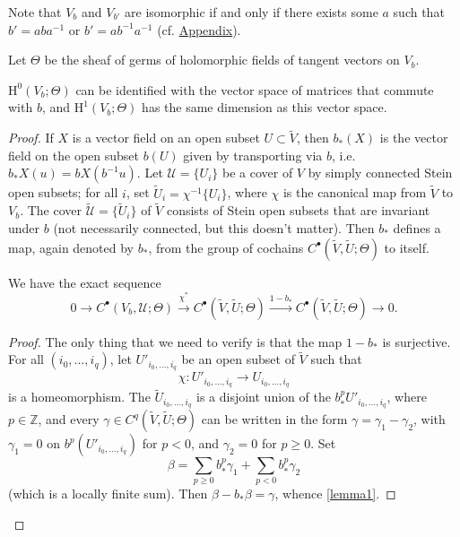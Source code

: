 \documentclass{article}
\theoremstyle{plain}
\newenvironment{proposition}[1]
    {\renewcommand\theinnercustomproposition{#1}\innercustomproposition}
    {\endinnercustomproposition}
\newenvironment{lemma}[1]
    {\renewcommand\theinnercustomlemma{#1}\innercustomlemma}
    {\endinnercustomlemma}
\theoremstyle{definition}
\newcommand{\ZZ}{\mathbb{Z}}
\newcommand{\HH}{\mathrm{H}}
\renewcommand{\geq}{\geqslant}
\newcommand{\oldpage}[1]{\marginpar{\footnotesize$\Big\vert$ \textit{p.~#1}}}
\begin{document}
Note that $V_b$ and $V_{b'}$ are isomorphic if and only if there exists some $a$ such that $b'=aba^{-1}$ or $b'=ab^{-1}a^{-1}$ (cf. \hyperref[appendix]{Appendix}).

Let $\Theta$ be the sheaf of germs of holomorphic fields of tangent vectors on $V_b$.

\begin{proposition}{2}
\label{proposition2}
  $\HH^0(V_b;\Theta)$ can be identified with the vector space of matrices that commute with $b$, and $\HH^1(V_b;\Theta)$ has the same dimension as this vector space.
\end{proposition}

\begin{proof}
  If $X$ is a vector field on an open subset $U\subset\widetilde{V}$, then $b_*(X)$ is the vector field on the open subset $b(U)$ given by transporting via $b$, i.e. $b_*X(u)=bX(b^{-1}u)$.
  Let $\mathscr{U}=\{U_i\}$ be a cover of $V$ by simply connected Stein open subsets;
  for all $i$, set $\widetilde{U}_i=\chi^{-1}\{U_i\}$, where $\chi$ is the canonical map from $\widetilde{V}$ to $V_b$.
  The cover $\widetilde{\mathscr{U}}=\{\widetilde{U}_i\}$ of $\widetilde{V}$ consists of Stein open subsets that are invariant under $b$ (not necessarily connected, but this doesn't matter).
  Then $b_*$ defines a map, again denoted by $b_*$, from the group of cochains $C^\bullet(\widetilde{V},\widetilde{U};\Theta)$ to itself.

  \begin{lemma}{1}
  \label{lemma1}
    We have the exact sequence
    \[
      0
      \to C^\bullet(V_b,\mathscr{U};\Theta)
      \xrightarrow{\chi^*} C^\bullet(\widetilde{V},\widetilde{U};\Theta)
      \xrightarrow{1-b_*} C^\bullet(\widetilde{V},\widetilde{U};\Theta)
      \to 0.
    \]
  \end{lemma}

  \begin{proof}
    The only thing that we need to verify is that the map $1-b_*$ is surjective.
    For all $(i_0,\ldots,i_q)$, let $U'_{i_0,\ldots,i_q}$ be an open subset of $\widetilde{V}$ such that
  \oldpage{3-05}
    \[
      \chi\colon U'_{i_0,\ldots,i_q} \to U_{i_0,\ldots,i_q}
    \]
    is a homeomorphism.
    The $\widetilde{U}_{i_0,\ldots,i_q}$ is a disjoint union of the $b_*^p U'_{i_0,\ldots,i_q}$, where $p\in\ZZ$, and every $\gamma\in C^q(\widetilde{V},\widetilde{U};\Theta)$ can be written in the form $\gamma=\gamma_1-\gamma_2$, with $\gamma_1=0$ on $b^p(U'_{i_0,\ldots,i_q})$ for $p<0$, and $\gamma_2=0$ for $p\geq0$.
    Set
    \[
      \beta = \sum_{p\geq0} b_*^p\gamma_1 + \sum_{p<0} b_*^p\gamma_2
    \]
    (which is a locally finite sum).
    Then $\beta-b_*\beta=\gamma$, whence \cref{lemma1}.
  \end{proof}


\end{proof}
\end{document}
